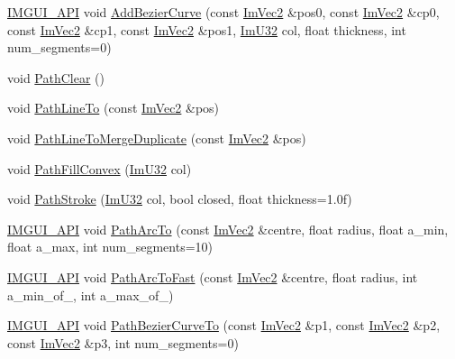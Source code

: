 \begin{DoxyCompactItemize}
\item 
\mbox{\hyperlink{imgui_8h_a43829975e84e45d1149597467a14bbf5}{I\+M\+G\+U\+I\+\_\+\+A\+PI}} void \mbox{\hyperlink{struct_im_draw_list_afd2eeeb8ed23b6222513953b03620101}{Add\+Bezier\+Curve}} (const \mbox{\hyperlink{struct_im_vec2}{Im\+Vec2}} \&pos0, const \mbox{\hyperlink{struct_im_vec2}{Im\+Vec2}} \&cp0, const \mbox{\hyperlink{struct_im_vec2}{Im\+Vec2}} \&cp1, const \mbox{\hyperlink{struct_im_vec2}{Im\+Vec2}} \&pos1, \mbox{\hyperlink{imgui_8h_a118cff4eeb8d00e7d07ce3d6460eed36}{Im\+U32}} col, float thickness, int num\+\_\+segments=0)
\item 
void \mbox{\hyperlink{struct_im_draw_list_ae9ad5f4d638b1bfd9383618dc60e3f18}{Path\+Clear}} ()
\item 
void \mbox{\hyperlink{struct_im_draw_list_a828d944325ed58d8b57abd3647bffaaf}{Path\+Line\+To}} (const \mbox{\hyperlink{struct_im_vec2}{Im\+Vec2}} \&pos)
\item 
void \mbox{\hyperlink{struct_im_draw_list_aa3dd11945fb62495f8b9e1392ed724e3}{Path\+Line\+To\+Merge\+Duplicate}} (const \mbox{\hyperlink{struct_im_vec2}{Im\+Vec2}} \&pos)
\item 
void \mbox{\hyperlink{struct_im_draw_list_aea9301cb99ebf4b27f5d3959017567c9}{Path\+Fill\+Convex}} (\mbox{\hyperlink{imgui_8h_a118cff4eeb8d00e7d07ce3d6460eed36}{Im\+U32}} col)
\item 
void \mbox{\hyperlink{struct_im_draw_list_ac3172e376a4b77915bb22b6d8092b8b2}{Path\+Stroke}} (\mbox{\hyperlink{imgui_8h_a118cff4eeb8d00e7d07ce3d6460eed36}{Im\+U32}} col, bool closed, float thickness=1.\+0f)
\item 
\mbox{\hyperlink{imgui_8h_a43829975e84e45d1149597467a14bbf5}{I\+M\+G\+U\+I\+\_\+\+A\+PI}} void \mbox{\hyperlink{struct_im_draw_list_acb69ef7febcc54c9e5e09d2460c85b61}{Path\+Arc\+To}} (const \mbox{\hyperlink{struct_im_vec2}{Im\+Vec2}} \&centre, float radius, float a\+\_\+min, float a\+\_\+max, int num\+\_\+segments=10)
\item 
\mbox{\hyperlink{imgui_8h_a43829975e84e45d1149597467a14bbf5}{I\+M\+G\+U\+I\+\_\+\+A\+PI}} void \mbox{\hyperlink{struct_im_draw_list_a713cca3862e88aa1ee671db1c4cf6bdb}{Path\+Arc\+To\+Fast}} (const \mbox{\hyperlink{struct_im_vec2}{Im\+Vec2}} \&centre, float radius, int a\+\_\+min\+\_\+of\+\_, int a\+\_\+max\+\_\+of\+\_)
\item 
\mbox{\hyperlink{imgui_8h_a43829975e84e45d1149597467a14bbf5}{I\+M\+G\+U\+I\+\_\+\+A\+PI}} void \mbox{\hyperlink{struct_im_draw_list_a495ca7dd4fd5a898e2414658321f4b18}{Path\+Bezier\+Curve\+To}} (const \mbox{\hyperlink{struct_im_vec2}{Im\+Vec2}} \&p1, const \mbox{\hyperlink{struct_im_vec2}{Im\+Vec2}} \&p2, const \mbox{\hyperlink{struct_im_vec2}{Im\+Vec2}} \&p3, int num\+\_\+segments=0)

\end{DoxyCompactItemize}
